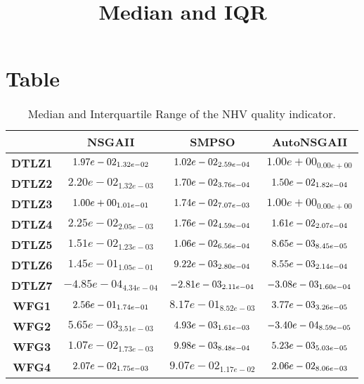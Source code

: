 \documentclass{article}
\title{Median and IQR}
\author{}
\begin{document}
\maketitle
\section{Table}
\begin{table}[!htp]
  \caption{Median and Interquartile Range of the NHV quality indicator.}
  \label{table:NHV}
  \centering
  \begin{scriptsize}
  \begin{tabular}{c|ccc}
      & \textbf{NSGAII} & \textbf{SMPSO} & \textbf{AutoNSGAII} \\\hline
      \textbf{DTLZ1} & $\cellcolor{gray25} 1.97e-02_{1.32e-02} $ & $ \cellcolor{gray95} 1.02e-02_{2.59e-04} $ & $ 1.00e+00_{0.00e+00}$ \\
      \textbf{DTLZ2} & $2.20e-02_{1.32e-03} $ & $ \cellcolor{gray25} 1.70e-02_{3.76e-04} $ & $ \cellcolor{gray95} 1.50e-02_{1.82e-04}$ \\
      \textbf{DTLZ3} & $\cellcolor{gray25} 1.00e+00_{1.01e-01} $ & $ \cellcolor{gray95} 1.74e-02_{7.07e-03} $ & $ 1.00e+00_{0.00e+00}$ \\
      \textbf{DTLZ4} & $2.25e-02_{2.05e-03} $ & $ \cellcolor{gray25} 1.76e-02_{4.59e-04} $ & $ \cellcolor{gray95} 1.61e-02_{2.07e-04}$ \\
      \textbf{DTLZ5} & $1.51e-02_{1.23e-03} $ & $ \cellcolor{gray25} 1.06e-02_{6.56e-04} $ & $ \cellcolor{gray95} 8.65e-03_{8.45e-05}$ \\
      \textbf{DTLZ6} & $1.45e-01_{1.05e-01} $ & $ \cellcolor{gray25} 9.22e-03_{2.80e-04} $ & $ \cellcolor{gray95} 8.55e-03_{2.14e-04}$ \\
      \textbf{DTLZ7} & $-4.85e-04_{4.34e-04} $ & $ \cellcolor{gray25} -2.81e-03_{2.11e-04} $ & $ \cellcolor{gray95} -3.08e-03_{1.60e-04}$ \\
      \textbf{WFG1} & $\cellcolor{gray25} 2.56e-01_{1.74e-01} $ & $ 8.17e-01_{8.52e-03} $ & $ \cellcolor{gray95} 3.77e-03_{3.26e-05}$ \\
      \textbf{WFG2} & $5.65e-03_{3.51e-03} $ & $ \cellcolor{gray25} 4.93e-03_{1.61e-03} $ & $ \cellcolor{gray95} -3.40e-04_{8.59e-05}$ \\
      \textbf{WFG3} & $1.07e-02_{1.73e-03} $ & $ \cellcolor{gray25} 9.98e-03_{8.48e-04} $ & $ \cellcolor{gray95} 5.23e-03_{5.03e-05}$ \\
      \textbf{WFG4} & $\cellcolor{gray25} 2.07e-02_{1.75e-03} $ & $ 9.07e-02_{1.17e-02} $ & $ \cellcolor{gray95} 2.06e-02_{8.06e-03}$ \\

\end{tabular}
\end{scriptsize}
\end{table}
\end{document}
